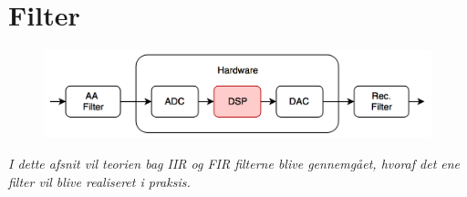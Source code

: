 \chapter{Filter}\label{kap:filter}

\begin{figure}[h]
	\centering
	\includegraphics[width=15cm]{billeder/flow_dsp}
	\centering	
\end{figure}

\emph{I dette afsnit vil teorien bag IIR og FIR filterne blive gennemgået, hvoraf det ene filter vil blive realiseret i praksis.}